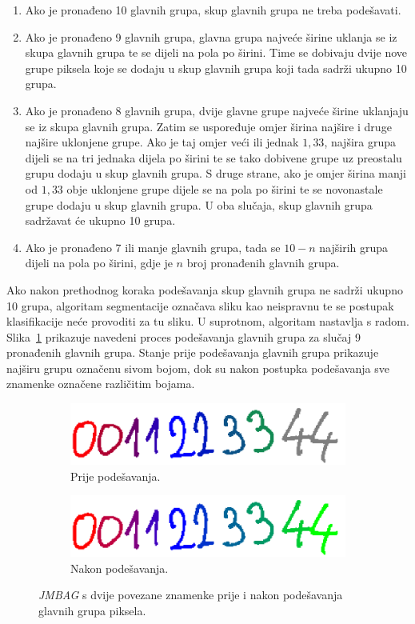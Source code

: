 \begin{enumerate}
    \item Ako je pronađeno 10 glavnih grupa, skup glavnih grupa ne treba podešavati.
    \item Ako je pronađeno 9 glavnih grupa, glavna grupa najveće širine uklanja se iz skupa glavnih grupa te se dijeli
    na pola po širini. Time se dobivaju dvije nove grupe piksela koje se dodaju u skup glavnih grupa koji tada sadrži
    ukupno 10 grupa.
    \item Ako je pronađeno 8 glavnih grupa, dvije glavne grupe najveće širine uklanjaju se iz skupa glavnih grupa.
    Zatim se uspoređuje omjer širina najšire i druge najšire uklonjene grupe. Ako je taj omjer veći ili jednak $1{,}33$,
    najšira grupa dijeli se na tri jednaka dijela po širini te se tako dobivene grupe uz preostalu grupu dodaju u skup
    glavnih grupa. S druge strane, ako je omjer širina manji od $1{,}33$ obje uklonjene grupe dijele se na pola po
    širini te se novonastale grupe dodaju u skup glavnih grupa. U oba slučaja, skup glavnih grupa sadržavat će ukupno
    10 grupa.
    \item Ako je pronađeno 7 ili manje glavnih grupa, tada se $10 - n$ najširih grupa dijeli na pola po širini, gdje je
    $n$ broj pronađenih glavnih grupa.
\end{enumerate}
Ako nakon prethodnog koraka podešavanja skup glavnih grupa ne sadrži ukupno 10 grupa, algoritam segmentacije označava
sliku kao neispravnu te se postupak klasifikacije neće provoditi za tu sliku. U suprotnom, algoritam nastavlja s radom.
Slika\ \ref{fig:segmentation-division} prikazuje navedeni proces podešavanja glavnih grupa za slučaj 9 pronađenih
glavnih grupa. Stanje prije podešavanja glavnih grupa prikazuje najširu grupu označenu sivom bojom, dok su nakon
postupka podešavanja sve znamenke označene različitim bojama.
\begin{figure}[htb]
    \begin{subfigure}{\textwidth}
        \centering
        \includegraphics[width=12cm]{images/chapter4/segmentation-before-division.png}
        \caption{Prije podešavanja.}
    \end{subfigure}
    \begin{subfigure}{\textwidth}
        \centering
        \includegraphics[width=12cm]{images/chapter4/segmentation-after-division.png}
        \caption{Nakon podešavanja.}
    \end{subfigure}
    \caption{\emph{JMBAG} s dvije povezane znamenke prije i nakon podešavanja glavnih grupa piksela.}
    \label{fig:segmentation-division}
\end{figure}
